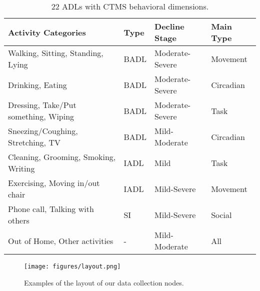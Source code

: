 \documentclass[sigconf, anonymous, 9pt, nonacm]{acmart}
\begin{document}



\begin{table}[t]
\centering
\scriptsize
\begin{tabular}{@{}p{3.8cm}p{0.8cm}p{1.5cm}p{1.5cm}@{}}
\toprule
\textbf{Activity Categories} & \textbf{Type} & \textbf{Decline Stage} & \textbf{Main Type} \\
\midrule
Walking, Sitting, Standing, Lying & BADL & Moderate-Severe & Movement \\
Drinking, Eating & BADL & Moderate-Severe & Circadian \\
Dressing, Take/Put something, Wiping & BADL & Moderate-Severe & Task \\
Sneezing/Coughing, Stretching, TV & BADL & Mild-Moderate & Circadian \\
Cleaning, Grooming, Smoking, Writing & IADL & Mild & Task \\
Exercising, Moving in/out chair & IADL & Mild-Severe & Movement \\
Phone call, Talking with others & SI & Mild-Severe & Social \\
Out of Home, Other activities & - & Mild-Moderate & All \\
\bottomrule
\end{tabular}
\caption{22 ADLs with CTMS behavioral dimensions.}
\label{tab:activities}

\vspace{-2em}
\end{table}
\begin{figure}[htbp]
\centering
\texttt{[image: figures/layout.png]}
\caption{Examples of the layout of our data collection nodes.}
\label{fig:layout}
\vspace{-2em}
\end{figure}
\end{document}
